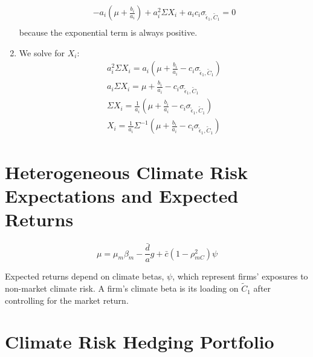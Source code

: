 \begin{enumerate}
\begin{equation}
\begin{aligned}
            -a_i(\mu + \frac{b_i}{a_i}) + a_i^2 \Sigma X_i + a_i c_i \sigma_{\tilde{\epsilon}_1, \tilde{C}_1} = 0 \\
        \end{aligned}
    \end{equation}
    because the exponential term is always positive.
    \item We solve for $X_i$:
    \begin{equation}
        \begin{aligned}
            a_i^2 \Sigma X_i = a_i(\mu + \frac{b_i}{a_i} - c_i \sigma_{\tilde{\epsilon}_1, \tilde{C}_1}) \\
            a_i \Sigma X_i = \mu + \frac{b_i}{a_i} - c_i \sigma_{\tilde{\epsilon}_1, \tilde{C}_1} \\
            \Sigma X_i = \frac{1}{a_i}( \mu + \frac{b_i}{a_i} - c_i \sigma_{\tilde{\epsilon}_1, \tilde{C}_1}) \\
            X_i = \frac{1}{a_i}\Sigma^{-1} ( \mu + \frac{b_i}{a_i} - c_i \sigma_{\tilde{\epsilon}_1, \tilde{C}_1})
        \end{aligned}
    \end{equation}
\end{enumerate}


\section{Heterogeneous Climate Risk Expectations and Expected Returns}

\begin{equation}
    \mu = \mu_m \beta_m - \frac{\bar{d}}{a}g + \bar{c}(1 - \rho^2_{mC}) \psi 
\end{equation}

Expected returns depend on climate betas, $\psi$, which represent 
firms' exposures to non-market climate risk. A firm's climate 
beta is its loading on $\tilde{C}_1$ after controlling for the market return. 

\section{Climate Risk Hedging Portfolio}
